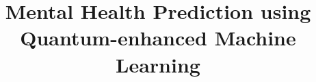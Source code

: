 \documentclass[10pt,journal,compsoc]{IEEEtran}
\begin{document}
%
\title{Mental Health Prediction using \\ Quantum-enhanced Machine Learning}
%
%
%
%
\end{document}
